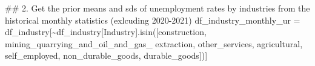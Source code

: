 \documentclass[
]{agujournal2019}
\newenvironment{Shaded}{\begin{snugshade}}{\end{snugshade}}
\newcommand{\CommentTok}[1]{\textcolor[rgb]{0.37,0.37,0.37}{#1}}
\newcommand{\NormalTok}[1]{\textcolor[rgb]{0.00,0.23,0.31}{#1}}
\newcommand{\OperatorTok}[1]{\textcolor[rgb]{0.37,0.37,0.37}{#1}}
\newcommand{\StringTok}[1]{\textcolor[rgb]{0.13,0.47,0.30}{#1}}
\begin{document}
\begin{Shaded}
\begin{Highlighting}[]
\CommentTok{\#\# 2. Get the prior means and sds of unemployment rates by industries from the historical monthly statistics (exlcuding 2020{-}2021)}
\NormalTok{df\_industry\_monthly\_ur }\OperatorTok{=}\NormalTok{ df\_industry[}\OperatorTok{\textasciitilde{}}\NormalTok{df\_industry[}\StringTok{\textquotesingle{}Industry\textquotesingle{}}\NormalTok{].isin([}\StringTok{\textquotesingle{}construction\textquotesingle{}}\NormalTok{,}
                              \StringTok{\textquotesingle{}mining\_quarrying\_and\_oil\_and\_gas\_ extraction\textquotesingle{}}\NormalTok{,}
                              \StringTok{\textquotesingle{}other\_services\textquotesingle{}}\NormalTok{,}
                              \StringTok{\textquotesingle{}agricultural\textquotesingle{}}\NormalTok{,}
                              \StringTok{\textquotesingle{}self\_employed\textquotesingle{}}\NormalTok{,}
                              \StringTok{\textquotesingle{}non\_durable\_goods\textquotesingle{}}\NormalTok{,}
                              \StringTok{\textquotesingle{}durable\_goods\textquotesingle{}}\NormalTok{])]}


\end{Highlighting}
\end{Shaded}
\end{document}
